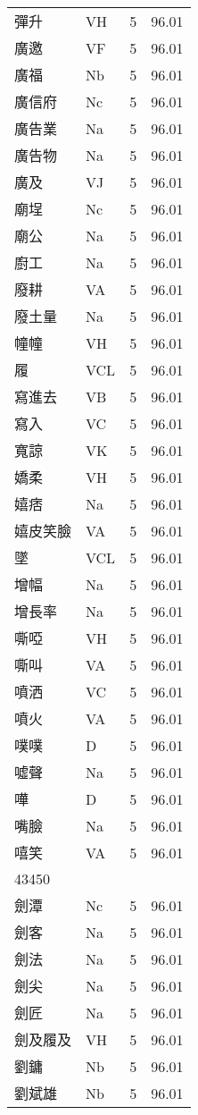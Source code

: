 \documentclass[twocolumn]{book}
\begin{document}
\begin{supertabular}{llrr}
彈升 & VH & 5 &  96.01\\
廣邀 & VF & 5 &  96.01\\
廣福 & Nb & 5 &  96.01\\
廣信府 & Nc & 5 &  96.01\\
廣告業 & Na & 5 &  96.01\\
廣告物 & Na & 5 &  96.01\\
廣及 & VJ & 5 &  96.01\\
廟埕 & Nc & 5 &  96.01\\
廟公 & Na & 5 &  96.01\\
廚工 & Na & 5 &  96.01\\
廢耕 & VA & 5 &  96.01\\
廢土量 & Na & 5 &  96.01\\
幢幢 & VH & 5 &  96.01\\
履 & VCL & 5 &  96.01\\
寫進去 & VB & 5 &  96.01\\
寫入 & VC & 5 &  96.01\\
寬諒 & VK & 5 &  96.01\\
嬌柔 & VH & 5 &  96.01\\
嬉痞 & Na & 5 &  96.01\\
嬉皮笑臉 & VA & 5 &  96.01\\
墜 & VCL & 5 &  96.01\\
增幅 & Na & 5 &  96.01\\
增長率 & Na & 5 &  96.01\\
嘶啞 & VH & 5 &  96.01\\
嘶叫 & VA & 5 &  96.01\\
噴洒 & VC & 5 &  96.01\\
噴火 & VA & 5 &  96.01\\
噗噗 & D & 5 &  96.01\\
噓聲 & Na & 5 &  96.01\\
嘩 & D & 5 &  96.01\\
嘴臉 & Na & 5 &  96.01\\
嘻笑 & VA & 5 &  96.01\\
43450\\
劍潭 & Nc & 5 &  96.01\\
劍客 & Na & 5 &  96.01\\
劍法 & Na & 5 &  96.01\\
劍尖 & Na & 5 &  96.01\\
劍匠 & Na & 5 &  96.01\\
劍及履及 & VH & 5 &  96.01\\
劉鏞 & Nb & 5 &  96.01\\
劉斌雄 & Nb & 5 &  96.01\\

\end{supertabular}
\end{document}
